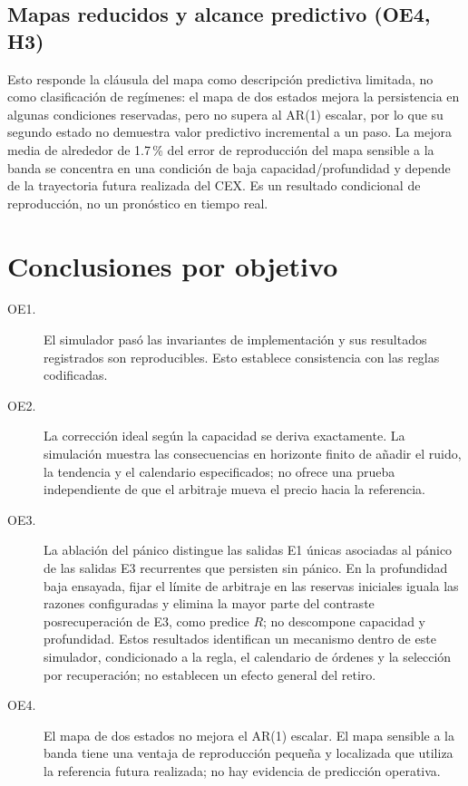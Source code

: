 \subsection{Mapas reducidos y alcance predictivo (OE4, H3)}

Esto responde la cláusula del mapa como descripción predictiva limitada, no como clasificación de regímenes: el mapa de dos estados mejora la persistencia en algunas condiciones reservadas, pero no supera al AR(1) escalar, por lo que su segundo estado no demuestra valor predictivo incremental a un paso. La mejora media de alrededor de 1.7\,\% del error de reproducción del mapa sensible a la banda se concentra en una condición de baja capacidad/profundidad y depende de la trayectoria futura realizada del CEX. Es un resultado condicional de reproducción, no un pronóstico en tiempo real.

\section{Conclusiones por objetivo}

\begin{description}
  \item[OE1.] El simulador pasó las invariantes de implementación y sus resultados registrados son reproducibles. Esto establece consistencia con las reglas codificadas.
  \item[OE2.] La corrección ideal según la capacidad se deriva exactamente. La simulación muestra las consecuencias en horizonte finito de añadir el ruido, la tendencia y el calendario especificados; no ofrece una prueba independiente de que el arbitraje mueva el precio hacia la referencia.
  \item[OE3.] La ablación del pánico distingue las salidas E1 únicas asociadas al pánico de las salidas E3 recurrentes que persisten sin pánico. En la profundidad baja ensayada, fijar el límite de arbitraje en las reservas iniciales iguala las razones configuradas y elimina la mayor parte del contraste posrecuperación de E3, como predice $R$; no descompone capacidad y profundidad. Estos resultados identifican un mecanismo dentro de este simulador, condicionado a la regla, el calendario de órdenes y la selección por recuperación; no establecen un efecto general del retiro.
  \item[OE4.] El mapa de dos estados no mejora el AR(1) escalar. El mapa sensible a la banda tiene una ventaja de reproducción pequeña y localizada que utiliza la referencia futura realizada; no hay evidencia de predicción operativa.
\end{description}

